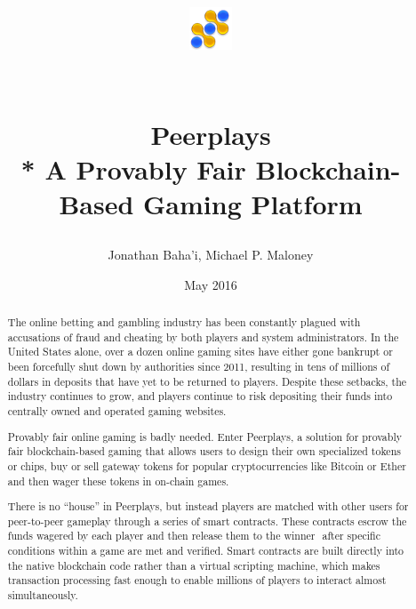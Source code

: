 \documentclass[a4paper,titlepage,final]{article}
\begin{document}
\title{\begin{center}\includegraphics[width=48]{fig/logo}\end{center}\\
Peerplays\\* A Provably Fair Blockchain-Based Gaming Platform}


\author{Jonathan Baha’i, Michael P. Maloney}

\date{May 2016}

\begin{abstract}
The online betting and gambling industry has been constantly plagued with accusations of fraud and cheating by both players and system administrators. In the United States alone, over a dozen online gaming sites have either gone bankrupt or been forcefully shut down by authorities since 2011, resulting in tens of millions of dollars in deposits that have yet to be returned to players. Despite these setbacks, the industry continues to grow, and players continue to risk depositing their funds into centrally owned and operated gaming websites. 

Provably fair online gaming is badly needed. Enter Peerplays, a solution for provably fair blockchain-based gaming that allows users to design their own specialized tokens or chips, buy or sell gateway tokens for popular cryptocurrencies like Bitcoin or Ether and then wager these tokens in on-chain games. 

There is no “house” in Peerplays, but instead players are matched with other users for peer-to-peer gameplay through a series of smart contracts. These contracts escrow the funds wagered by each player and then release them to the winner ​ after specific conditions within a game are met and verified. Smart contracts are built directly into the native blockchain code rather than a virtual scripting machine, which makes transaction processing fast enough to enable millions of players to interact almost simultaneously.
\end{abstract}

\maketitle
\end{document}
